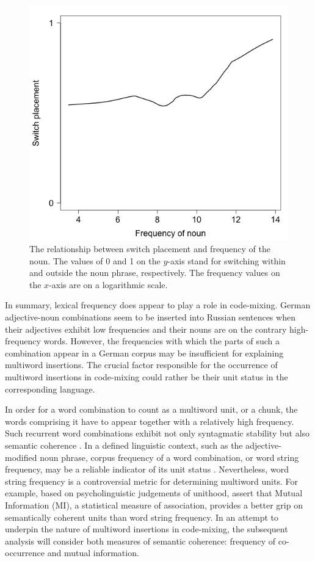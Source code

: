 \begin{figure}
    \includegraphics[scale=0.5]{figures/4-Fr_N.png}
	\caption{The relationship between switch placement and frequency of the noun. The values of 0 and 1 on the $y$-axis stand for switching within and outside the noun phrase, respectively. The frequency values on the $x$-axis are on a logarithmic scale.\label{fig:4:noun}}
\end{figure}

In summary, lexical frequency does appear to play a role in code-mixing. German adjective-noun combinations seem to be inserted into Russian sentences when their adjectives exhibit low frequencies and their nouns are on the contrary high-frequency words. However, the frequencies with which the parts of such a combination appear in a German corpus may be insufficient for explaining multiword insertions. The crucial factor responsible for the occurrence of multiword insertions in code-mixing could rather be their unit status in the corresponding language. 

In order for a word combination to count as a multiword unit, or a chunk, the words comprising it have to appear together with a relatively high frequency. Such recurrent word combinations exhibit not only syntagmatic stability but also semantic coherence \citep[cf.][136]{bybee-book-2010}. In a defined linguistic context, such as the adjective-modified noun phrase, corpus frequency of a word combination, or word string frequency, may be a reliable indicator of its unit status \citep[][]{heylen-2014}. Nevertheless, word string frequency is a controversial metric for determining multiword units. For example, based on psycholinguistic judgements of unithood, \citet{simpson.vlach&ellis2010} assert that Mutual Information (MI), a statistical measure of association, provides a better grip on semantically coherent units than word string frequency. In an attempt to underpin the nature of multiword insertions in code-mixing, the subsequent analysis will consider both measures of semantic coherence:  frequency of co-occurrence and mutual information.  

